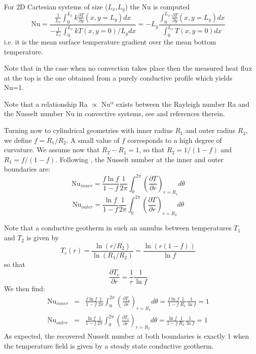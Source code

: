 \begin{itemize}
For 2D Cartesian systems of size ($L_x$,$L_y$) the Nu is computed \cite{blbc89}
\[
\text{Nu} = 
 \frac{\frac{1}{L_x}\int_{0}^{L_x} k \frac{\partial T}{\partial y}(x,y=L_y) dx }
{-\frac{1}{L_x}\int_0^{L_x} k T(x,y=0) /L_y dx}
=-L_y \frac{\int_{0}^{L_x} \frac{\partial T}{\partial y}(x,y=L_y) dx }{\int_0^{L_x} T(x,y=0) dx}
\]
i.e. it is the mean surface temperature gradient
over the mean bottom temperature.


Note that in the case when no convection takes place then the measured heat flux at the top is 
the one obtained from a purely conductive profile which yields Nu=1.

Note that a relationship Ra $\propto$ Nu$^\alpha $ exists between the Rayleigh number Ra and the Nusselt number Nu in convective systems, see \cite{wodd09} and references therein. 

Turning now to cylindrical geometries with inner radius $R_1$ and outer radius $R_2$, we define $f=R_1/R_2$. A small value of $f$ corresponds to a high
degree of curvature. We assume now that $R_2-R_1=1$, so that $R_2=1/(1-f)$ and $R_1=f/(1-f)$. 
Following \cite{jarv93}, the Nusselt number at the inner and outer boundaries are:
\begin{equation}
\boxed{
\text{Nu}_{inner} = \frac{f \ln f}{1-f} \frac{1}{2\pi} \int_0^{2\pi} \left( \frac{\partial T}{\partial r} \right)_{r=R_1} d\theta
}
\label{eqNuAnnIn}
\end{equation}
\begin{equation}
\boxed{
\text{Nu}_{outer} = \frac{\ln f}{1-f} \frac{1}{2\pi} \int_0^{2\pi} \left( \frac{\partial T}{\partial r} \right)_{r=R_2} d\theta
}
\label{eqNuAnnOut}
\end{equation}

Note that a conductive geotherm in such an annulus between temperatures $T_1$ and $T_2$ is given by 
\[
T_c(r)=\frac{\ln (r/R_2)}{\ln(R_1/R_2)} = \frac{\ln(r(1-f))}{\ln f}
\]
so that 
\[
\frac{\partial T_c}{\partial r} = \frac{1}{r}\frac{1}{\ln f} 
\]
We then find:
\begin{eqnarray}
\text{Nu}_{inner} 
&=& \frac{f \ln f}{1-f} \frac{1}{2\pi} \int_0^{2\pi} \left( \frac{\partial T_c}{\partial r} \right)_{r=R_1} d\theta
= \frac{f \ln f}{1-f} \frac{1}{R_1}\frac{1}{\ln f} 
= 1 \\
\text{Nu}_{outer} 
&=& \frac{\ln f}{1-f} \frac{1}{2\pi} \int_0^{2\pi} \left( \frac{\partial T_c}{\partial r} \right)_{r=R_2} d\theta 
= \frac{\ln f}{1-f} \frac{1}{R_2}\frac{1}{\ln f} = 1 
\end{eqnarray}
As expected, the recovered Nusselt number at both boundaries is exactly 1 when the temperature field is
given by a steady state conductive geotherm.


\end{itemize}
